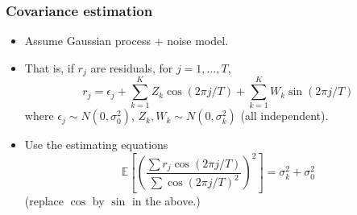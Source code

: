 \documentclass{beamer}
\begin{document}
\begin{frame}
\frametitle{Covariance estimation}
\begin{itemize}
\item Assume Gaussian process + noise model.
\item That is, if $r_j$ are residuals, for $j = 1,\hdots,T$,
\[
r_j = \epsilon_j + \sum_{k=1}^K Z_k \cos(2\pi j/T) + \sum_{k=1}^K W_k \sin(2\pi j/T)
\]
where $\epsilon_j \sim N(0,\sigma^2_0)$, $Z_k, W_k \sim N(0,\sigma^2_k)$ (all independent).
\item Use the estimating equations 
\[\mathbb{E}\left[\left(\frac{\sum r_j \cos(2\pi j/T)}{\sum \cos(2\pi j/T)^2}\right)^2\right] = \sigma^2_k +\sigma^2_0\]
(replace $\cos$ by $\sin$ in the above.)
\end{itemize}
\end{frame}
\end{document}
